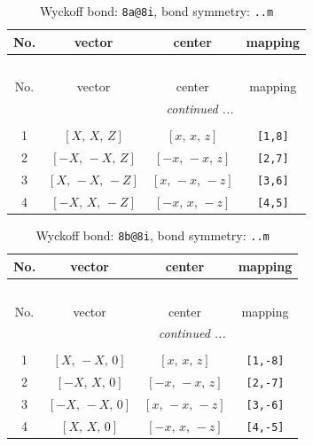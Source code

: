 \documentclass[fleqn,8pt]{jsarticle}
\begin{document}
\begin{longtable}{cccc}
\caption{Wyckoff bond: {\tt 8a@8i}, bond symmetry: {\tt ..m}}
 \\
 \hline \hline
No. & vector & center & mapping \\ \hline \endfirsthead

\multicolumn{3}{l}{\tablename\ \thetable{}} \\
 \hline \hline
No. & vector & center & mapping \\ \hline \endhead

 \hline \hline
\multicolumn{3}{r}{\footnotesize\it continued ...} \\ \endfoot

 \hline \hline
\multicolumn{3}{r}{} \\ \endlastfoot

1 & $\left[ X,\, X,\, Z \right]$ & $\left[ x,\, x,\, z \right]$ & {\tt [1,8]} \\ \hline
2 & $\left[ - X,\, - X,\, Z \right]$ & $\left[ - x,\, - x,\, z \right]$ & {\tt [2,7]} \\ \hline
3 & $\left[ X,\, - X,\, - Z \right]$ & $\left[ x,\, - x,\, - z \right]$ & {\tt [3,6]} \\ \hline
4 & $\left[ - X,\, X,\, - Z \right]$ & $\left[ - x,\, x,\, - z \right]$ & {\tt [4,5]} \\
\end{longtable}
\renewcommand{\arraystretch}{1.2}
\begin{longtable}{cccc}
\caption{Wyckoff bond: {\tt 8b@8i}, bond symmetry: {\tt ..m}}
 \\
 \hline \hline
No. & vector & center & mapping \\ \hline \endfirsthead

\multicolumn{3}{l}{\tablename\ \thetable{}} \\
 \hline \hline
No. & vector & center & mapping \\ \hline \endhead

 \hline \hline
\multicolumn{3}{r}{\footnotesize\it continued ...} \\ \endfoot

 \hline \hline
\multicolumn{3}{r}{} \\ \endlastfoot

1 & $\left[ X,\, - X,\, 0 \right]$ & $\left[ x,\, x,\, z \right]$ & {\tt [1,-8]} \\ \hline
2 & $\left[ - X,\, X,\, 0 \right]$ & $\left[ - x,\, - x,\, z \right]$ & {\tt [2,-7]} \\ \hline
3 & $\left[ - X,\, - X,\, 0 \right]$ & $\left[ x,\, - x,\, - z \right]$ & {\tt [3,-6]} \\ \hline
4 & $\left[ X,\, X,\, 0 \right]$ & $\left[ - x,\, x,\, - z \right]$ & {\tt [4,-5]} \\
\end{longtable}
\end{document}
